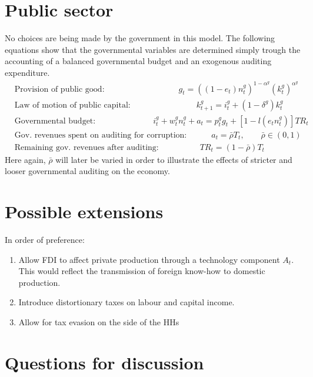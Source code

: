 \documentclass[]{scrartcl}
\begin{document}
\section{Public sector}
No choices are being made by the government in this model. The following equations show that the governmental variables are determined simply trough the accounting of a balanced governmental budget and an exogenous auditing expenditure.
\begin{align}
&\text{Provision of public good:}\qquad\qquad\qquad\qquad\quad g_t=\left( (1-e_t)n_t^g \right)^{1-\alpha^g}\left( k_t^g \right)^{\alpha^g}\\
&\text{Law of motion of public capital:}\qquad\qquad\qquad\qquad  k_{t+1}^g= i^g_t+(1-\delta^g)k_t^g\\
&\text{Governmental budget:}\qquad\qquad\qquad\quad i^g_t+w_t^gn_t^g+a_t= p^g_tg_t+\left[ 1-l\left( e_tn_t^g \right) \right]TR_t\\
&\text{Gov. revenues spent on auditing for corruption:}\quad\qquad  a_t= \bar{\rho}T_t,\qquad \bar{\rho} \in (0,1)\\
&\text{Remaining gov. revenues after auditing:}\qquad\qquad\quad TR_t=(1-\bar{\rho}) T_t
\end{align}
Here again, $ \bar{\rho} $ will later be varied in order to illustrate the effects of stricter and looser governmental auditing on the economy.

\section{Possible extensions}
In order of preference:
\begin{enumerate}
\item Allow FDI to affect private production through a technology component $ A_t $. This would reflect the transmission of foreign know-how to domestic production.
\item Introduce distortionary taxes on labour and capital income.
\item Allow for tax evasion on the side of the HHs
\end{enumerate}

\section{Questions for discussion}
\end{document}
